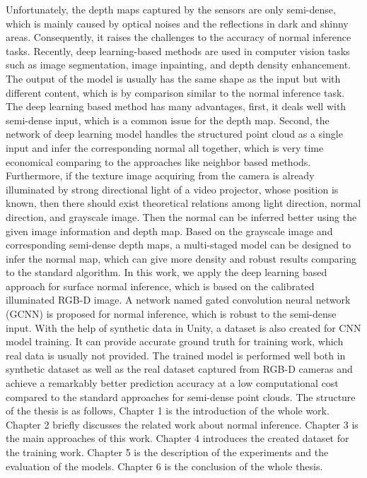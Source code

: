 Unfortunately, the depth maps captured by the sensors are only semi-dense, which is mainly caused by optical noises and the reflections in dark and shinny areas. Consequently, it raises the challenges to the accuracy of normal inference tasks. 
Recently, deep learning-based methods are used in computer vision tasks such as image segmentation, image inpainting, and depth density enhancement. The output of the model is usually has the same shape as the input but with different content, which is by comparison similar to the normal inference task. 
The deep learning based method has many advantages, first, it deals well with semi-dense input, which is a common issue for the depth map. Second, the network of deep learning model handles the structured point cloud as a single input and infer the corresponding normal all together, which is very time economical comparing to the approaches like neighbor based methods. Furthermore, if the texture image acquiring from the camera is already illuminated by strong directional light of a video projector, whose position is known, then there should exist theoretical relations among light direction, normal direction, and grayscale image. Then the normal can be inferred better using the given image information and depth map.  Based on the grayscale image and corresponding semi-dense depth maps, a multi-staged model can be designed to infer the normal map, which can give more density and robust results comparing to the standard algorithm.
In this work, we apply the deep learning based approach for surface normal inference, which is based on the calibrated illuminated RGB-D image. A network named gated convolution neural network (GCNN) is proposed for normal inference, which is robust to the semi-dense input. 
With the help of synthetic data in Unity, a dataset is also created for CNN model training. It can provide accurate ground truth for training work, which real data is usually not provided. The trained model is performed well both in synthetic dataset as well as the real dataset captured from RGB-D cameras and achieve a remarkably better prediction accuracy at a low computational cost compared to the standard approaches for semi-dense point clouds.  
The structure of the thesis is as follows, Chapter 1 is the introduction of the whole work. Chapter 2 briefly discusses the related work about normal inference. Chapter 3 is the main approaches of this work. Chapter 4 introduces the created dataset for the training work. Chapter 5 is the description of the experiments and the evaluation of the models. Chapter 6 is the conclusion of the whole thesis.


